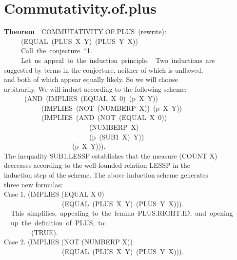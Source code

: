 \documentclass[10pt]{book}
\newenvironment{pubasis}{\begin{flushleft}}{\end{flushleft}}
\newcommand{\axiomordefinition}[1]{\vspace{6pt}\Large\textsf{\textbf{#1}}\normalsize}
\begin{document}
\section{Commutativity.of.plus}
\begin{pubasis}
\axiomordefinition{Theorem}~~COMMUTATIVITY.OF.PLUS~(rewrite):\\
~~~~~(EQUAL~(PLUS~X~Y)~(PLUS~Y~X))\\

~~~~~Call~the~conjecture~*1.\\

~~~~~Let~us~appeal~to~the~induction~principle.~~Two~inductions~are\\
suggested by terms in the conjecture, neither of which is unflawed,\\
and both of which appear equally likely.  So we will choose\\
arbitrarily.  We will induct according to the following scheme:\\
~~~~~~(AND~(IMPLIES~(EQUAL~X~0)~(p~X~Y))\\
~~~~~~~~~~~(IMPLIES~(NOT~(NUMBERP~X))~(p~X~Y))\\
~~~~~~~~~~~(IMPLIES~(AND~(NOT~(EQUAL~X~0))\\
~~~~~~~~~~~~~~~~~~~~~~~~~(NUMBERP~X)\\
~~~~~~~~~~~~~~~~~~~~~~~~~(p~(SUB1~X)~Y))\\
~~~~~~~~~~~~~~~~~~~~(p~X~Y))).\\
The inequality SUB1.LESSP establishes that the measure (COUNT X)\\
decreases according to the well-founded relation LESSP in the\\
induction step of the scheme.  The above induction scheme generates\\
three new formulas:\\

Case 1.	(IMPLIES (EQUAL X 0)\\
~~~~~~~~~~~~~~~~~(EQUAL~(PLUS~X~Y)~(PLUS~Y~X))).\\

~~This~simplifies,~appealing~to~the~lemma~PLUS.RIGHT.ID,~and~opening\\
~~up~the~definition~of~PLUS,~to:\\

~~~~~~~~(TRUE).\\

Case 2.	(IMPLIES (NOT (NUMBERP X))\\
~~~~~~~~~~~~~~~~~(EQUAL~(PLUS~X~Y)~(PLUS~Y~X))).\\


\end{pubasis}
\end{document}

